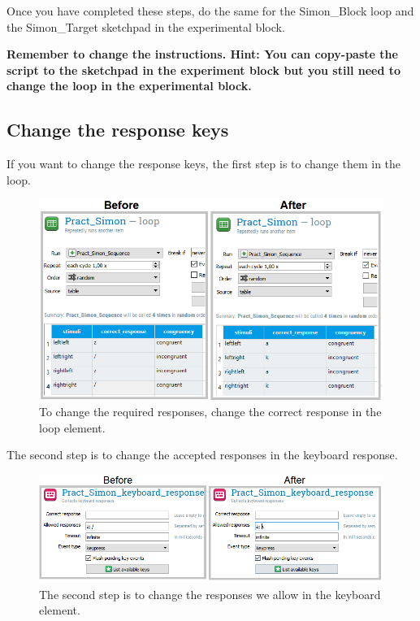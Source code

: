 \documentclass[
]{book}
\begin{document}
Once you have completed these steps, do the same for the Simon\_Block loop and the Simon\_Target sketchpad in the experimental block.

\textbf{Remember to change the instructions. Hint: You can copy-paste the script to the sketchpad in the experiment block but you still need to change the loop in the experimental block.}

\hypertarget{change-the-response-keys}{%
\subsection{Change the response keys}\label{change-the-response-keys}}

If you want to change the response keys, the first step is to change them in the loop.

\begin{figure}

{\centering \includegraphics[width=0.99\linewidth]{images/changesimon/09response1} 

}

\caption{To change the required responses, change the correct response in the loop element.}\label{fig:Figure3-15}
\end{figure}

The second step is to change the accepted responses in the keyboard response.

\begin{figure}

{\centering \includegraphics[width=0.99\linewidth]{images/changesimon/10response2} 

}

\caption{The second step is to change the responses we allow in the keyboard element.}\label{fig:Figure3-16}
\end{figure}
\end{document}
